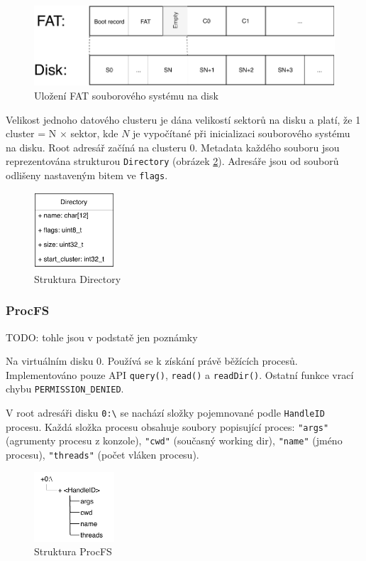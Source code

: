 \documentclass[11pt,a4paper]{scrartcl}
\begin{document}
	\begin{figure}[H]
		\centering
		\includegraphics[width=12cm]{fat-rozdeleni-disku.pdf}
		\caption{Uložení FAT souborového systému na disk}
		\label{fig:fat-disk-struct}
	\end{figure}

	Velikost jednoho datového clusteru je dána velikostí sektorů na disku a platí, že 1 cluster = N $\times$ sektor, kde $N$ je vypočítané při inicializaci souborového systému na disku. Root adresář začíná na clusteru 0. Metadata každého souboru jsou reprezentována strukturou \verb|Directory| (obrázek \ref{fig:dir-c}). Adresáře jsou od souborů odlišeny nastaveným bitem ve \verb|flags|.
	
	\begin{figure}[H]
		\centering
		\includegraphics[width=3cm]{dir-c.pdf}
		\caption{Struktura Directory}
		\label{fig:dir-c}
	\end{figure}


	\subsubsection{ProcFS}
	TODO: tohle jsou v podstatě jen poznámky
	
	Na virtuálním disku 0. Používá se k získání právě běžících procesů. Implementováno pouze API \verb|query()|, \verb|read()| a \verb|readDir()|. Ostatní funkce vrací chybu \verb|PERMISSION_DENIED|.
	
	V root adresáři disku \verb|0:\| se nachází složky pojemnované podle \verb|HandleID| procesu. Každá složka procesu obsahuje soubory popisující proces: \verb|"args"| (agrumenty procesu z konzole), \verb|"cwd"| (současný working dir), \verb|"name"| (jméno procesu), \verb|"threads"| (počet vláken procesu).
	
	\begin{figure}[H]
		\centering
		\includegraphics[width=3cm]{procfs-struct.pdf}
		\caption{Struktura ProcFS}
		\label{fig:procfs-struct}
	\end{figure}
	
\end{document}
